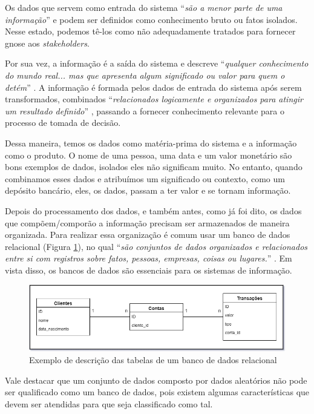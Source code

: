 Os dados que servem como entrada do sistema \enquote{\textit{são a menor parte de uma informação}} \cite{boscarioli2016mineracao} e podem ser definidos como conhecimento bruto ou fatos isolados. Nesse estado, podemos tê-los como não adequadamente tratados para fornecer gnose aos \textit{stakeholders}.

Por sua vez, a informação é a saída do sistema e descreve \enquote{\textit{qualquer conhecimento do mundo real... mas que apresenta algum significado ou valor para quem o detém}} \cite{boscarioli2016mineracao}. A informação é formada pelos dados de entrada do sistema após serem transformados, combinados \enquote{\textit{relacionados logicamente e organizados para atingir um resultado definido}} \cite{vida2021datawarehouse}, passando a fornecer conhecimento relevante para o processo de tomada de decisão.

Dessa maneira, temos os dados como matéria-prima do sistema e a informação como o produto. O nome de uma pessoa, uma data e um valor monetário são bons exemplos de dados, isolados eles não significam muito. No entanto, quando combinamos esses dados e atribuímos um significado ou contexto, como um depósito bancário, eles, os dados, passam a ter valor e se tornam informação.

Depois do processamento dos dados, e também antes, como já foi dito, os dados que compõem/comporão a informação precisam ser armazenados de maneira organizada. Para realizar essa organização é comum usar um banco de dados relacional (Figura \ref{fig:bancoDadosRelacional}), no qual \enquote{\textit{são conjuntos de dados organizados e relacionados entre si com registros sobre fatos, pessoas, empresas, coisas ou lugares.}} \cite{rezende2015obi}. Em vista disso, os bancos de dados são essenciais para os sistemas de informação.

\begin{figure}[ht]
\centering
\includegraphics[width=1\textwidth]{imagens/banco-relacional.png}
\caption{Exemplo de descrição das tabelas de um banco de dados relacional}
\label{fig:bancoDadosRelacional}
\end{figure}

Vale destacar que um conjunto de dados composto por dados aleatórios não pode ser qualificado como um banco de dados, pois existem algumas características que devem ser atendidas para que seja classificado como tal.

